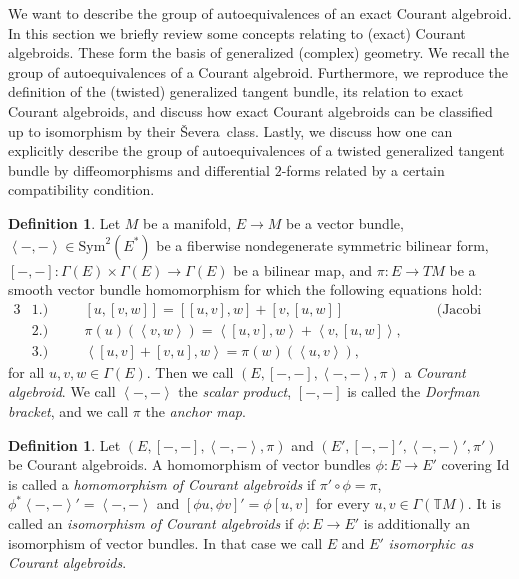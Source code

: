 \documentclass[12pt,a4paper]{article}
\theoremstyle{plain}
\theoremstyle{definition}
\newtheorem{definition}[theorem]{Definition}
\newcommand{\scal}[2]{\left\langle #1,#2\right\rangle}
\newcommand{\Id}{\mathrm{Id}}
\newcommand{\Severa}{\v{S}evera}
\begin{document}
We want to describe the group of autoequivalences of an exact Courant algebroid. In this section we briefly review some concepts relating to (exact) Courant algebroids. These form the basis of generalized (complex) geometry. We recall the group of autoequivalences of a Courant algebroid. Furthermore, we reproduce the definition of the (twisted) generalized tangent bundle, its relation to exact Courant algebroids, and discuss how exact Courant algebroids can be classified up to isomorphism by their \Severa\ class. Lastly, we discuss how one can explicitly describe the group of autoequivalences of a twisted generalized tangent bundle by diffeomorphisms and differential $2$-forms related by a certain compatibility condition. 


\begin{definition}
Let $M$ be a manifold, $E\to M$ be a vector bundle, $\scal{-}{-}\in \mathrm{Sym}^2(E^*)$ be a fiberwise nondegenerate symmetric bilinear form, $[-,-]:\Gamma(E)\times \Gamma(E)\to \Gamma(E)$ be a bilinear map, and $\pi:E\to TM$ be a smooth vector bundle homomorphism for which the following equations hold:
\begin{alignat*}{3}
&\text{1.)} \quad && [u,[v,w]]=[[u,v],w]+[v,[u,w]] \quad && \text{(Jacobi identity),} \\
&\text{2.)} \quad && \pi(u)(\scal{v}{w})=\scal{[u,v]}{w}+\scal{v}{[u,w]} \text{,} \quad && \\
&\text{3.)} \quad && \scal{[u,v]+[v,u]}{w}=\pi(w)(\scal{u}{v}) \text{,} \quad &&
\end{alignat*}
for all $u,v,w\in \Gamma(E)$. Then we call $(E,[-,-],\scal{-}{-},\pi)$ a \textit{Courant algebroid}. We call $\scal{-}{-}$ the \textit{scalar product}, $[-,-]$ is called the \textit{Dorfman bracket}, and we call $\pi$ the \textit{anchor map}.
\end{definition}

\begin{definition}
Let $(E,[-,-],\scal{-}{-},\pi)$ and $(E',[-,-]',\scal{-}{-}',\pi')$ be Courant algebroids. A homomorphism of vector bundles $\phi:E\to E'$ covering $\Id$ is called a \textit{homomorphism of Courant algebroids} if $\pi'\circ \phi =\pi$, $\phi^*\scal{-}{-}'=\scal{-}{-}$ and $[\phi u,\phi v]'=\phi [u,v]$ for every $u,v\in \Gamma(\mathbb TM)$. It is called an \textit{isomorphism of Courant algebroids} if $\phi:E\to E'$ is additionally an isomorphism of vector bundles. In that case we call $E$ and $E'$ \textit{isomorphic as Courant algebroids}.
\end{definition}
\end{document}
